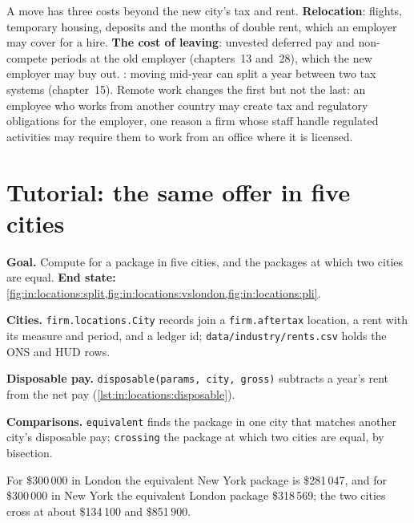 A move has three costs beyond the new city's tax and rent. \textbf{Relocation}: flights, temporary housing, deposits and
the months of double rent, which an employer may cover for a hire. \textbf{The cost of leaving}: unvested deferred pay and
non-compete periods at the old employer (chapters~13 and~28), which the new employer may buy out. \textbf{}: moving mid-year can split a year between two tax systems (chapter~15). Remote work changes the first but not the last: an employee who works from another country
may create tax and regulatory obligations for the employer, one reason a firm whose staff handle regulated activities
may require them to work from an office where it is licensed.

\section{Tutorial: the same offer in five cities}\label{tut:in:locations:tut}

\begin{tutorial}
\textbf{Goal.} Compute  for a package in five cities, and the packages at which two cities are
equal.
\textbf{End state:} \cref{fig:in:locations:split,fig:in:locations:vslondon,fig:in:locations:pli}.
\begin{tutsteps}
\item \textbf{Cities.} \texttt{firm.locations.City} records join a \texttt{firm.aftertax} location, a rent with its
measure and period, and a ledger id; \texttt{data/industry/rents.csv} holds the ONS and HUD rows.
\item \textbf{Disposable pay.} \texttt{disposable(params, city, gross)} subtracts a year's rent from the net pay
(\cref{lst:in:locations:disposable}).
\label{lst:in:locations:disposable}
\item \textbf{Comparisons.} \texttt{equivalent} finds the package in one city that matches another city's disposable
pay; \texttt{crossing} the package at which two cities are equal, by bisection.
\end{tutsteps}
\end{tutorial}

For \$300\,000 in London the equivalent New York package is \$281\,047, and for \$300\,000 in New York the equivalent
London package \$318\,569; the two cities cross at about \$134\,100 and \$851\,900.

